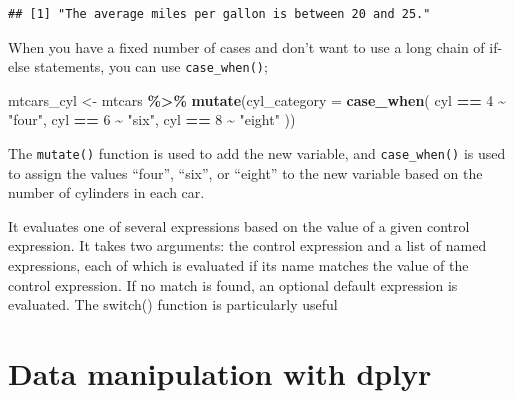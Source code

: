 \documentclass[
  12pt,
  oneside]{book}
\newenvironment{Shaded}{\begin{snugshade}}{\end{snugshade}}
\newcommand{\AttributeTok}[1]{\textcolor[rgb]{0.13,0.29,0.53}{#1}}
\newcommand{\CommentTok}[1]{\textcolor[rgb]{0.56,0.35,0.01}{\textit{#1}}}
\newcommand{\DecValTok}[1]{\textcolor[rgb]{0.00,0.00,0.81}{#1}}
\newcommand{\FunctionTok}[1]{\textcolor[rgb]{0.13,0.29,0.53}{\textbf{#1}}}
\newcommand{\NormalTok}[1]{#1}
\newcommand{\OtherTok}[1]{\textcolor[rgb]{0.56,0.35,0.01}{#1}}
\newcommand{\SpecialCharTok}[1]{\textcolor[rgb]{0.81,0.36,0.00}{\textbf{#1}}}
\newcommand{\StringTok}[1]{\textcolor[rgb]{0.31,0.60,0.02}{#1}}
\theoremstyle{definition}
\theoremstyle{definition}
\theoremstyle{definition}
\theoremstyle{definition}
\theoremstyle{remark}
\begin{document}
\begin{verbatim}
## [1] "The average miles per gallon is between 20 and 25."
\end{verbatim}

\begin{Shaded}
\end{Shaded}

When you have a fixed number of cases and don't want to use a long chain of if-else statements, you can use \texttt{case\_when()};

\begin{Shaded}
\begin{Highlighting}[]
\NormalTok{mtcars\_cyl }\OtherTok{\textless{}{-}}\NormalTok{ mtcars }\SpecialCharTok{\%\textgreater{}\%}
  \FunctionTok{mutate}\NormalTok{(}\AttributeTok{cyl\_category =} \FunctionTok{case\_when}\NormalTok{(}
\NormalTok{    cyl }\SpecialCharTok{==} \DecValTok{4} \SpecialCharTok{\textasciitilde{}} \StringTok{"four"}\NormalTok{,}
\NormalTok{    cyl }\SpecialCharTok{==} \DecValTok{6} \SpecialCharTok{\textasciitilde{}} \StringTok{"six"}\NormalTok{,}
\NormalTok{    cyl }\SpecialCharTok{==} \DecValTok{8} \SpecialCharTok{\textasciitilde{}} \StringTok{"eight"}
\NormalTok{  ))}
\end{Highlighting}
\end{Shaded}

The \texttt{mutate()} function is used to add the new variable, and \texttt{case\_when()} is used to assign the values ``four'', ``six'', or ``eight'' to the new variable based on the number of cylinders in each car.

It evaluates one of several expressions based on the value of a given control expression. It takes two arguments: the control expression and a list of named expressions, each of which is evaluated if its name matches the value of the control expression. If no match is found, an optional default expression is evaluated. The switch() function is particularly useful

\hypertarget{data-manipulation-with-dplyr}{%
\section{Data manipulation with dplyr}\label{data-manipulation-with-dplyr}}
\end{document}
